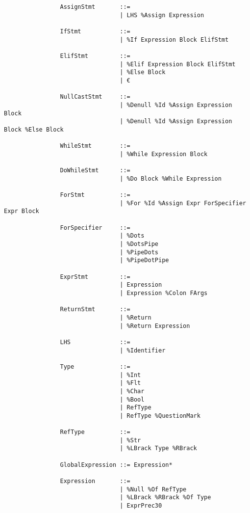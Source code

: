 \documentclass{article}
\begin{document}
\begin{verbatim}
				AssignStmt       ::=
				                 | LHS %Assign Expression
				                 
				IfStmt           ::=
				                 | %If Expression Block ElifStmt
				                 
				ElifStmt         ::=
				                 | %Elif Expression Block ElifStmt
				                 | %Else Block
				                 | €
				                 
				NullCastStmt     ::=
				                 | %Denull %Id %Assign Expression Block
				                 | %Denull %Id %Assign Expression Block %Else Block
				                 
				WhileStmt        ::=
				                 | %While Expression Block
				
				DoWhileStmt      ::=
				                 | %Do Block %While Expression
				                 
				ForStmt          ::=
				                 | %For %Id %Assign Expr ForSpecifier Expr Block
				                 
				ForSpecifier     ::=
				                 | %Dots
				                 | %DotsPipe
				                 | %PipeDots
				                 | %PipeDotPipe
				                 
				ExprStmt         ::=
				                 | Expression
				                 | Expression %Colon FArgs
				                 
				ReturnStmt       ::=
				                 | %Return
				                 | %Return Expression
				                 
				LHS              ::=
				                 | %Identifier
				                 
				Type             ::=
				                 | %Int
				                 | %Flt
				                 | %Char
				                 | %Bool
				                 | RefType
				                 | RefType %QuestionMark
				                 
				RefType          ::=
				                 | %Str
				                 | %LBrack Type %RBrack
				                 
				GlobalExpression ::= Expression*
			
				Expression       ::=
				                 | %Null %Of RefType
				                 | %LBrack %RBrack %Of Type
				                 | ExprPrec30
				

\end{verbatim}
\end{document}
